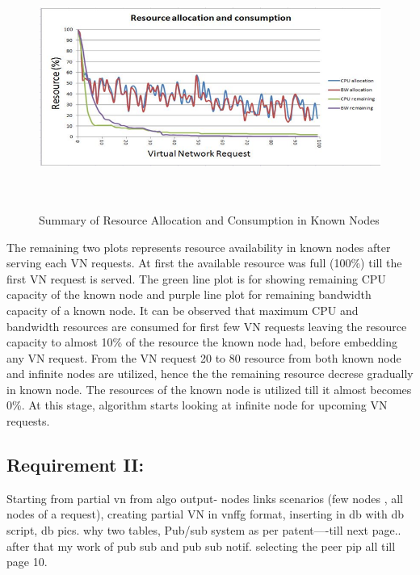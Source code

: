 \documentclass[article,dr=phil,type=msc ,colorback,accentcolor=tud4b]{tudthesis}
\begin{document}
\begin{figure}[h]
	\centering
	\includegraphics[width=15cm, height=8cm]{RES_CON_PE.png}
	\caption{Summary of Resource Allocation and Consumption in Known Nodes}
	\label{resr_consumption}
\end{figure}
The remaining two plots represents resource availability in known nodes after serving each VN requests. At first the available resource was full (100\%) till the first VN request is served. The green line plot is for showing remaining CPU capacity of the known node and purple line plot for remaining bandwidth capacity of a known node. It can be observed that maximum CPU and bandwidth resources are consumed for first few VN requests leaving the resource capacity to almost 10\% of the resource the known node had, before embedding any VN request. From the VN request 20 to 80 resource from both known node and infinite nodes are utilized, hence the the remaining resource decrese gradually in known node. The resources of the known node is utilized till it almost becomes 0\%. At this stage, algorithm starts looking at infinite node for upcoming VN requests. 
\newpage
\subsection{Requirement II: }

Starting from partial vn from algo output- nodes links scenarios (few nodes , all nodes of a request), creating partial VN in vnffg format, inserting in db with db script, db pics. why two tables, 
Pub/sub system as per patent----till next page..
after that my work of pub sub and pub sub notif. selecting the peer pip all till page 10.
 
\newpage
 

\end{document}
